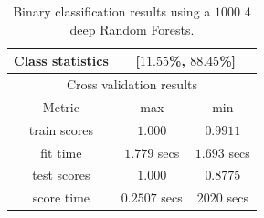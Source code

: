 \documentclass[a4paper, 11pt]{article}
\begin{document}
	\begin{table}[H]
		\caption{\label{tab::binary_rf_1000_4}Binary classification results using a $1000$ $4$ deep Random Forests.}
		\begin{tabular}{|c|c|c|}
			\hline
			Class statistics & \multicolumn{2}{|c|}{[$11.55$\%, $88.45$\%]} \\
			\hline
			\multicolumn{3}{|c|}{Cross validation results}\\
			\hline
			Metric & max & min \\
			 \hline
			train scores & $1.000$ & $0.9911$ \\
			 \hline
			fit time & $1.779$ secs & $1.693$ secs \\
			 \hline
			test scores & $1.000$ & $0.8775$\\
			 \hline
			score time & $0.2507$ secs & $2020$ secs\\
			 \hline
		\end{tabular}
	\end{table}
\end{document}
